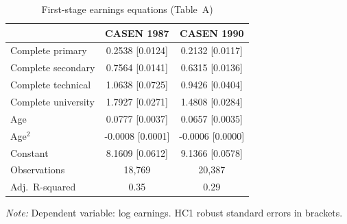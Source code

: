 \begin{table}[H]
    \centering
    \caption{First-stage earnings equations (Table~A)}\label{tab:mob-a}
    \begin{tabular}{lcc}
        \toprule
        & CASEN 1987 & CASEN 1990 \\
        \midrule
        Complete primary & 0.2538 [0.0124] & 0.2132 [0.0117] \\
        Complete secondary & 0.7564 [0.0141] & 0.6315 [0.0136] \\
        Complete technical & 1.0638 [0.0725] & 0.9426 [0.0404] \\
        Complete university & 1.7927 [0.0271] & 1.4808 [0.0284] \\
        Age & 0.0777 [0.0037] & 0.0657 [0.0035] \\
        Age$^2$ & -0.0008 [0.0001] & -0.0006 [0.0000] \\
        Constant & 8.1609 [0.0612] & 9.1366 [0.0578] \\
        Observations & 18,769 & 20,387 \\
        Adj.\ R-squared & 0.35 & 0.29 \\
        \bottomrule
    \end{tabular}
    \vspace{0.2em}
    \flushleft\footnotesize{\textit{Note:} Dependent variable: log earnings. HC1 robust standard errors in brackets.}
\end{table}

